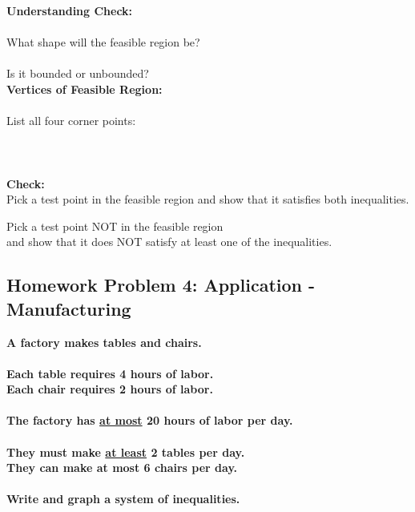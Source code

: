 \documentclass[12pt]{article}
\begin{document}
	        \newpage
	
	        \textbf{Understanding Check:}\\\\
		    What shape will the feasible region be? \underline{\hspace{2in}}\\\\
		    Is it bounded or unbounded? \underline{\hspace{2in}}\\
	
        	\textbf{Vertices of Feasible Region:}\\\\
		    List all four corner points:\\\\
			\hspace{1cm} \underline{\hspace{6in}}\\\\
	
	        \textbf{Check:}\\
		    Pick a test point in the feasible region and show that it satisfies both inequalities.
		
		    \vspace{3cm}
		
		    Pick a test point NOT in the feasible region\\
			and show that it does NOT satisfy at least one of the inequalities.\\
	
	        \newpage
	
	    \subsection*{Homework Problem 4: Application - Manufacturing}
		
            \textbf{A factory makes tables and chairs.\\\\
		    Each table requires 4 hours of labor.\\
		    Each chair requires 2 hours of labor.\\\\
		    The factory has \underline{at most} 20 hours of labor per day.\\\\
		    They must make \underline{at least} 2 tables per day.\\
		    They can make at most 6 chairs per day.\\\\
		    Write and graph a system of inequalities.}\\
	
\end{document}
